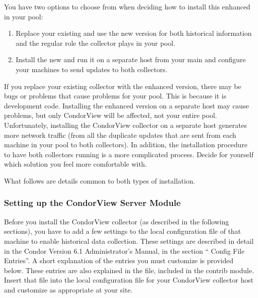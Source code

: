 You have two options to choose from when deciding how to install this
enhanced  in your pool:
\begin{enumerate}
\item Replace your existing  and use the new
version for both historical information and the regular role the 
collector plays in your pool.
\item Install the new  and run it on a separate host
from your main  and configure your machines to send
updates to both collectors.
\end{enumerate}

If you replace your existing collector with the enhanced version,
there may be bugs or problems that
cause problems for your pool.
This is because it is development code.
Installing the enhanced version on a separate
host may cause problems, but only CondorView will be affected, not
your entire pool.
Unfortunately, installing the CondorView collector on a separate host
generates more network traffic (from all the duplicate updates that
are sent from each machine in your pool to both collectors).
In addition, the installation procedure to have both collectors
running is a more complicated process.
Decide for yourself which solution you feel more
comfortable with.

What follows are details common to both types of installation.

\subsubsection{\label{sec:CondorView-Server-Setup}
Setting up the CondorView Server Module} 

Before you install the CondorView collector (as described in the
following sections), you have to add a few settings to the local
configuration file of that machine to enable historical data collection.
These settings are described in detail in the Condor Version 6.1
Administrator's Manual, in the section `` Config File
Entries''.
A short explanation of the entries you must customize is
provided below. 
These entries are also explained in the
 file, included
in the contrib module.
Insert that file into the local configuration file for your
CondorView collector host and customize as appropriate at your site.  

